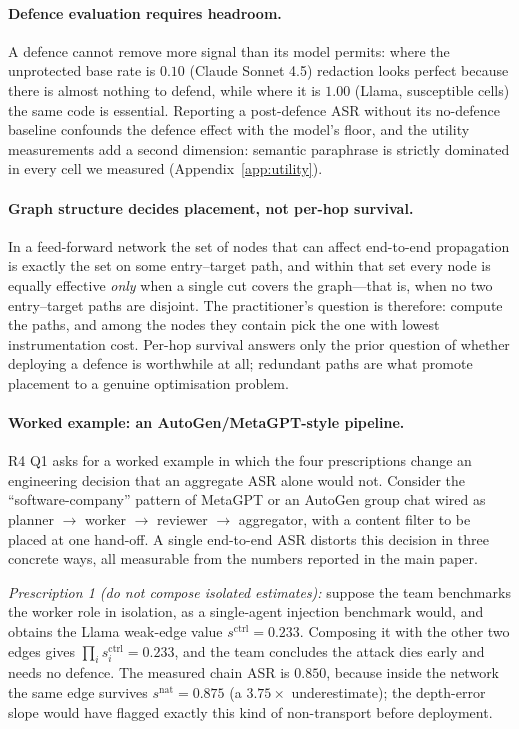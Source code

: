 \documentclass[sigconf,anonymous]{aamas}
\newcommand{\scite}[1]{\ensuremath{s^{\mathrm{ctrl}}_{#1}}}
\newcommand{\scites}{\ensuremath{s^{\mathrm{ctrl}}}}
\newcommand{\snats}{\ensuremath{s^{\mathrm{nat}}}}
\begin{document}
\paragraph{Defence evaluation requires headroom.} A defence cannot remove more signal
than its model permits: where the unprotected base rate is $0.10$ (Claude Sonnet 4.5)
redaction looks perfect because there is almost nothing to defend, while where it is
$1.00$ (Llama, susceptible cells) the same code is essential. Reporting a post-defence
ASR without its no-defence baseline confounds the defence effect with the model's
floor, and the utility measurements add a second dimension: semantic paraphrase is
strictly dominated in every cell we measured (Appendix~\ref{app:utility}).

\paragraph{Graph structure decides placement, not per-hop survival.} In a feed-forward
network the set of nodes that can affect end-to-end propagation is exactly the set on
some entry--target path, and within that set every node is equally effective
\emph{only} when a single cut covers the graph---that is, when no two entry--target
paths are disjoint. The practitioner's question is therefore: compute the paths, and
among the nodes they contain pick the one with lowest instrumentation cost. Per-hop
survival answers only the prior question of whether deploying a defence is worthwhile
at all; redundant paths are what promote placement to a genuine optimisation problem.

\paragraph{Worked example: an AutoGen/MetaGPT-style pipeline.} R4 Q1 asks for a worked
example in which the four prescriptions change an engineering decision that an aggregate
ASR alone would not. Consider the ``software-company'' pattern of MetaGPT or an AutoGen
group chat wired as planner $\to$ worker $\to$ reviewer $\to$ aggregator, with a content
filter to be placed at one hand-off. A single end-to-end ASR distorts this decision in
three concrete ways, all measurable from the numbers reported in the main paper.

\emph{Prescription 1 (do not compose isolated estimates):} suppose the team benchmarks
the worker role in isolation, as a single-agent injection benchmark would, and obtains
the Llama weak-edge value $\scites = 0.233$. Composing it with the other two edges gives
$\prod_i \scite{i} = 0.233$, and the team concludes the attack dies early and needs no
defence. The measured chain ASR is $0.850$, because inside the network the same edge
survives $\snats = 0.875$ (a $3.75\times$ underestimate); the depth-error slope would
have flagged exactly this kind of non-transport before deployment.
\end{document}
